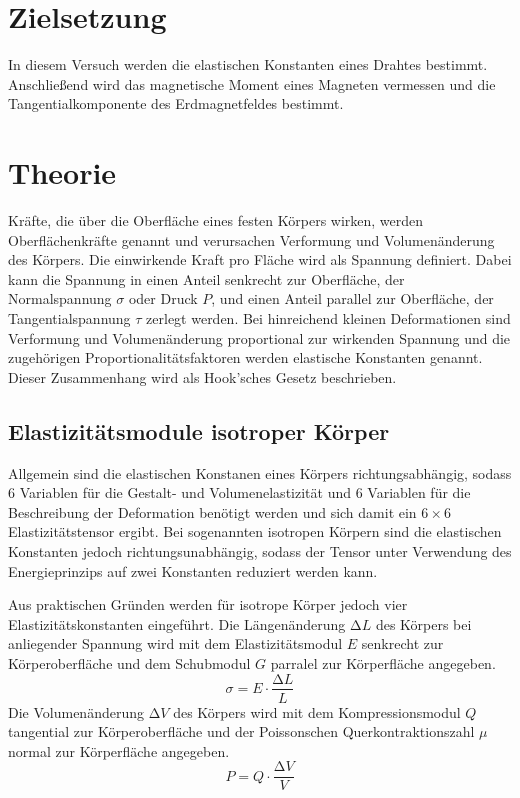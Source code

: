 \section{Zielsetzung}
\label{sec:Zielsetzung}

In diesem Versuch werden die elastischen Konstanten eines Drahtes bestimmt.
Anschließend wird das magnetische Moment eines Magneten vermessen
und die Tangentialkomponente des Erdmagnetfeldes bestimmt.

\section{Theorie}
\label{sec:Theorie}

Kräfte, die über die Oberfläche eines festen Körpers wirken, werden
Oberflächenkräfte genannt und verursachen Verformung und Volumenänderung des
Körpers.
Die einwirkende Kraft pro Fläche wird als Spannung definiert. Dabei kann die
Spannung in einen Anteil senkrecht zur Oberfläche, der
Normalspannung $\sigma$ oder Druck $P$, und einen Anteil parallel zur Oberfläche, der
Tangentialspannung $\tau$ zerlegt werden.
Bei hinreichend kleinen Deformationen sind Verformung und Volumenänderung
proportional zur wirkenden Spannung und die zugehörigen Proportionalitätsfaktoren werden
elastische Konstanten genannt. Dieser Zusammenhang wird als Hook'sches Gesetz
beschrieben.

\subsection{Elastizitätsmodule isotroper Körper}
\label{sec:Einführung}

Allgemein sind die elastischen Konstanen eines Körpers richtungsabhängig, sodass
6 Variablen für die Gestalt- und Volumenelastizität und 6 Variablen für die
Beschreibung der Deformation benötigt werden und sich damit ein
$6\times6$ Elastizitätstensor ergibt. Bei sogenannten isotropen Körpern sind
die elastischen Konstanten jedoch richtungsunabhängig, sodass der Tensor unter
Verwendung des Energieprinzips auf zwei Konstanten reduziert werden kann.

Aus praktischen Gründen werden für isotrope Körper jedoch vier
Elastizitätskonstanten eingeführt. Die Längenänderung $\increment L$ des Körpers bei
anliegender Spannung wird mit dem Elastizitätsmodul $E$ senkrecht zur
Körperoberfläche und dem Schubmodul $G$ parralel zur Körperfläche angegeben.
\begin{equation*}
  \sigma = E \cdot \frac{\increment L}{L}
\end{equation*}
Die Volumenänderung $\increment V$ des Körpers wird mit dem
Kompressionsmodul $Q$ tangential zur
Körperoberfläche und der Poissonschen Querkontraktionszahl $\mu$ normal zur
Körperfläche angegeben.
\begin{equation*}
  P = Q \cdot \frac{\increment V}{V}
\end{equation*}

